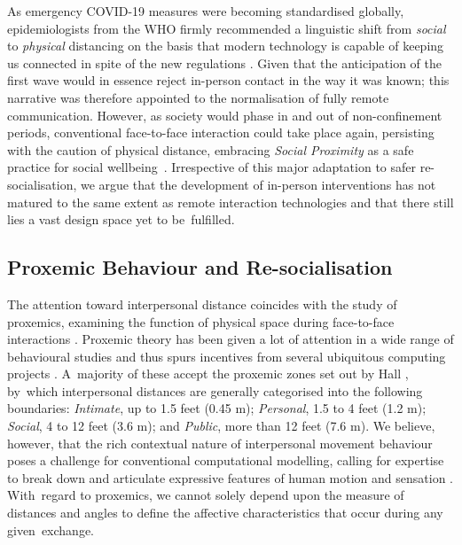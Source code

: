 {As emergency COVID-19 measures were becoming standardised globally, epidemiologists from the WHO firmly recommended a linguistic shift from \textit{social} to \textit{physical} distancing on the basis that modern technology is capable of keeping us connected in spite of the new regulations \citep{romania_interactional_2020}. Given that the anticipation of the first wave would in essence reject in-person contact in the way it was known; this narrative was therefore appointed to the normalisation of fully remote communication. However, as society would phase in and out of non-confinement periods, conventional face-to-face interaction could take place again, persisting with the caution of physical distance, embracing \textit{Social Proximity} as a safe practice for social wellbeing~\cite{long_covid-19_2021}. Irrespective of this major adaptation to safer re-socialisation, we argue that the development of in-person interventions has not matured to the same extent as remote interaction technologies and that there still lies a vast design space yet to be~fulfilled.

\subsection*{Proxemic Behaviour and Re-socialisation}
\label{subsec:Proxemic}

The attention toward interpersonal distance coincides with the study of proxemics, examining the function of physical space during face-to-face interactions \citep{hall_hidden_1966, guerrero_proxemics_2015}. Proxemic theory has been given a lot of attention in a wide range of behavioural studies \citep{mccall_mapping_2017} and thus spurs incentives from several ubiquitous computing projects \citep{perez_mobile_2020, marquardt_proxemic_2015}. A~majority of these accept the proxemic zones set out by Hall \cite{hall_hidden_1966}, by~which interpersonal distances are generally categorised into the following boundaries: \textit{Intimate}, up to 1.5 feet (0.45 m); \textit{Personal}, 1.5 to 4 feet (1.2 m); \textit{Social}, 4 to 12 feet (3.6 m); and \textit{Public}, more than 12 feet (7.6 m). We believe, however, that the rich contextual nature of interpersonal movement behaviour poses a challenge for conventional computational modelling, calling for expertise to break down and articulate expressive features of human motion and sensation \citep{fdili_alaoui_how_2015,schiphorst_self-evidence_2011}. With~regard to proxemics, we cannot solely depend upon the measure of distances and angles to define the affective characteristics that occur during any given~exchange.

}
